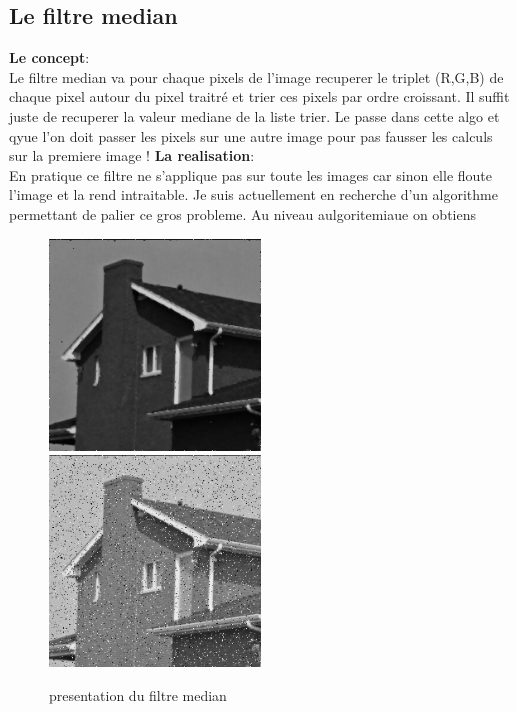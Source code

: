 \subsection{Le filtre median}
\textbf{Le concept}:\\
Le filtre median va pour chaque pixels de l'image recuperer le triplet (R,G,B) de chaque pixel autour du pixel traitré et trier ces pixels par ordre croissant. Il suffit juste de recuperer la valeur mediane de la liste trier. Le passe dans cette algo et qyue l'on doit passer les pixels sur une autre image pour pas fausser les calculs sur la premiere image !
\vspace{0.8cm}
\textbf{La realisation}:\\
En pratique ce filtre ne s'applique pas sur toute les images car sinon elle floute l'image et la rend intraitable. Je suis actuellement en recherche d'un algorithme permettant de palier ce gros probleme. Au niveau aulgoritemiaue on obtiens
\vspace{0.8cm}
\begin{figure}[h]
	\includegraphics[width=0.50\textwidth]{house.png}
	\includegraphics[width=0.50\textwidth]{house.jpg}
	\caption{presentation du filtre median}
\end{figure}
\newpage
